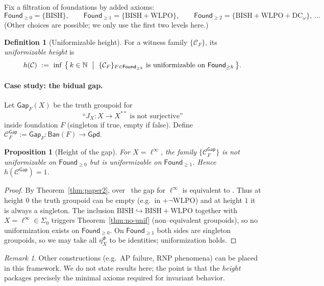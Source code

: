 \documentclass[11pt]{article}
\newtheorem{proposition}[theorem]{Proposition}
\theoremstyle{definition}
\newtheorem{definition}[theorem]{Definition}
\theoremstyle{remark}
\newtheorem{remark}[theorem]{Remark}
\newcommand{\N}{\mathbb{N}}
\newcommand{\linf}{\ell^\infty}
\newcommand{\WLPO}{\mathrm{WLPO}}
\newcommand{\BISH}{\mathrm{BISH}}
\newcommand{\Found}{\mathsf{Found}}
\newcommand{\Ban}{\mathsf{Ban}}
\newcommand{\Gpd}{\mathsf{Gpd}}
\newcommand{\SigmaZero}{\Sigma_{0}}
\begin{document}
Fix a filtration of foundations by added axioms:
\[
\Found_{\ge 0}=\{\BISH\},\qquad
\Found_{\ge 1}=\{\BISH+\WLPO\},\qquad
\Found_{\ge 2}=\{\BISH+\WLPO+\mathrm{DC}_\omega\},\ \ldots
\]
(Other choices are possible; we only use the first two levels here.)

\begin{definition}[Uniformizable height]
For a witness family \(\{\mathcal C_F\}\), its \emph{uniformizable height} is
\[
  h(\mathcal C)\ :=\ \inf\ \bigl\{\,k\in\N\ \bigm|\ 
    \{\mathcal C_F\}_{F\in \Found_{\ge k}} \text{ is uniformizable on }\Found_{\ge k}\,\bigr\}.
\]
\end{definition}

\paragraph{Case study: the bidual gap.}
Let \(\mathsf{Gap}_F(X)\) be the truth groupoid for
\[
  \text{``$J_X:X\to X^{**}$ is not surjective''}
\]
inside foundation \(F\) (singleton if true, empty if false). Define
\(
 \mathcal C^{\mathsf{Gap}}_F:=\mathsf{Gap}_F:\Ban(F)\to\Gpd.
\)

\begin{proposition}[Height of the gap]\label{prop:gap-height}
For \(X=\linf\), the family \(\{\mathcal C^{\mathsf{Gap}}_F\}\) is not uniformizable on \(\Found_{\ge 0}\) but is uniformizable on \(\Found_{\ge 1}\). Hence \(h(\mathcal C^{\mathsf{Gap}})=1\).
\end{proposition}

\begin{proof}
By Theorem~\ref{thm:paper2}, over \BISH\ the gap for \(\linf\) is equivalent to \WLPO. Thus at height \(0\) the truth groupoid can be empty (e.g.\ in \BISH+\(\neg\WLPO\)) and at height \(1\) it is always a singleton. The inclusion \(\BISH\hookrightarrow\BISH+\WLPO\) together with \(X=\linf\in\SigmaZero\) triggers Theorem~\ref{thm:no-unif} (non--equivalent groupoids), so no uniformization exists on \(\Found_{\ge 0}\). On \(\Found_{\ge 1}\) both sides are singleton groupoids, so we may take all \(\eta^\Phi_X\) to be identities; uniformization holds.
\end{proof}

\begin{remark}
Other constructions (e.g.\ AP failure, RNP phenomena) can be placed in this framework. We do not state results here; the point is that the \emph{height} packages precisely the minimal axioms required for invariant behavior.
\end{remark}
\end{document}
